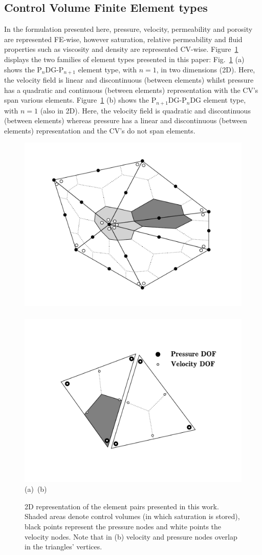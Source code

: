 \subsection{Control Volume Finite Element types}\label{ChapterMultiFluidsModel:Section:Element_Types}
In the formulation presented here, pressure, velocity, permeability and porosity are represented FE-wise, however saturation, relative permeability and fluid properties such as viscosity and density are represented CV-wise. Figure~\ref{fem_cv_represent_a} displays the two families of element types presented in this paper: Fig.~\ref{fem_cv_represent_a} (a) shows the P$_{n}$DG-P$_{n+1}$ element type, with $n = 1$, in two dimensions (2D). Here, the velocity field is linear and discontinuous (between elements) whilst pressure has a quadratic and continuous (between elements) representation with the CV's span various elements. Figure~\ref{fem_cv_represent_a} (b) shows the P$_{n+1}$DG-P$_{n}$DG element type, with $n = 1$ (also in 2D). Here, the velocity field is quadratic and discontinuous (between elements) whereas pressure has a linear and discontinuous (between elements) representation and the CV's do not span elements.
\begin{figure}[h]
   \vbox{
       \hbox{\includegraphics[width=.5\textwidth]{./Figs/p1dgp2-cont-sat.pdf}
             \includegraphics[width=.5\textwidth]{./Figs/p2dgp1-dg-sat.pdf}}
       \hbox{\hspace{3cm}(a)  \hspace{5.cm} (b)}}
\caption{2D representation of the element pairs presented in this work. Shaded areas denote control volumes (in which saturation is   stored), black points represent the pressure nodes and white points the velocity nodes. Note that in (b) velocity and pressure nodes overlap in the triangles' vertices.}
    \label{fem_cv_represent_a}
\end{figure} 

